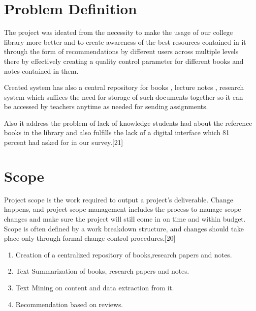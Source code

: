 \documentclass[a4paper,12pt]{report}
\begin{document}
\section{Problem Definition}

\par The project was ideated from the necessity to make the usage of our college library more better and to create awareness of the best resources contained in it through the form of recommendations by different users across multiple levels there by effectively creating a quality control parameter for different books and notes contained in them. \\

\par Created system has also a central repository for books , lecture notes , research system which suffices the need for storage of such documents together so it can be accessed by teachers anytime as needed for sending assignments.\\

\par Also it address the problem of lack of knowledge students had about the reference books in the library and also fulfills the lack of a digital interface which 81 percent had asked for in our survey.[21]\\

\section{Scope }

\par Project scope is the work required to output a project’s deliverable. Change happens, and project scope management includes the process to manage scope changes and make sure the project will still come in on time and within budget. Scope is often defined by a work breakdown structure, and changes should take place only through formal change control procedures.[20]\\

\begin{enumerate}
  \item Creation of a centralized repository of books,research papers and notes.
  \item Text Summarization of books, research papers and notes.
  \item Text Mining on content and data extraction from it.
  \item Recommendation based on reviews.
\end{enumerate}
\end{document}

